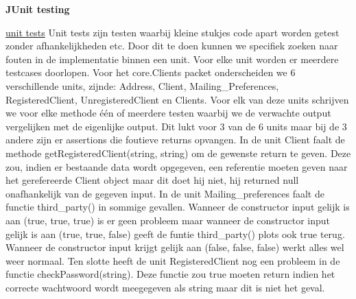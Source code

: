 \documentclass{article}
\begin{document}
\newpage
\maketitle
\noindent
\textbf{JUnit testing}\newline
\newline

\maketitle
\noindent
\underline{unit tests}\newline
\newline
Unit tests zijn testen waarbij kleine stukjes code apart worden getest zonder afhankelijkheden etc. Door dit te doen kunnen we specifiek zoeken naar fouten in de implementatie binnen een unit. Voor elke unit worden er meerdere testcases doorlopen. Voor het core.Clients packet onderscheiden we 6 verschillende units, zijnde: Address, Client, Mailing\_Preferences, RegisteredClient, UnregisteredClient en Clients. \newline
\newline
Voor elk van deze units schrijven we voor elke methode één of meerdere testen waarbij we de verwachte output vergelijken met de eigenlijke output.\newline
\newline
Dit lukt voor 3 van de 6 units maar bij de 3 andere zijn er assertions die foutieve returns opvangen. \newline
\newline
In de unit Client faalt de methode getRegisteredClient(string, string) om de gewenste return te geven. Deze zou, indien er bestaande data wordt opgegeven, een referentie moeten geven naar het gerefereerde Client object maar dit doet hij niet, hij returned null onafhankelijk van de gegeven input.\newline
\newline
In de unit Mailing\_preferences faalt de functie third\_party() in sommige gevallen. Wanneer de constructor input gelijk is aan (true, true, true) is er geen probleem maar wanneer de constructor input gelijk is aan (true, true, false) geeft de funtie third\_party() plots ook true terug. Wanneer de constructor input krijgt gelijk aan (false, false, false) werkt alles wel weer normaal. \newline
\newline
Ten slotte heeft de unit RegisteredClient nog een probleem in de functie checkPassword(string). Deze functie zou true moeten return indien het correcte wachtwoord wordt meegegeven als string maar dit is niet het geval.
\end{document}
